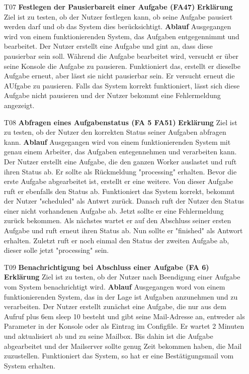 \documentclass[a4paper,12pt]{article}
\makeatletter
\newenvironment{mycode}
 {\def\@xobeysp{\ }\verbatim\rightskip=0pt plus 6em\relax}
 {\endverbatim}
\makeatother
\begin{document}
\begin{itemize}
\item[T07] \textbf{Festlegen der Pausierbareit einer Aufgabe (FA47)}
\subitem \textbf{Erklärung} Ziel ist zu testen, ob der Nutzer festlegen kann, ob seine Aufgabe pausiert werden darf und ob das System dies berücksichtigt.
\subitem \textbf{Ablauf} Ausgegangen wird von einem funktionierenden System, das Aufgaben entgegennimmt und bearbeitet.
Der Nutzer erstellt eine Aufgabe und gint an, dass diese pausierbar sein soll. Während die Aufgabe bearbeitet wird, versucht er über seine Konsole die Aufgabe zu pausieren.
Funktioniert das, erstellt er dieselbe Aufgabe erneut, aber lässt sie nicht pausierbar sein. Er versucht erneut die AUfgabe zu pausieren.
Falls das System korrekt funktioniert, lässt sich diese Aufgabe nicht pausieren und der Nutzer bekommt eine Fehlermeldung angezeigt.

\item[T08] \textbf{Abfragen eines Aufgabenstatus (FA 5 FA51)}
\subitem \textbf{Erklärung} Ziel ist zu testen, ob der Nutzer den korrekten Status seiner Aufgaben abfragen kann.
\subitem \textbf{Ablauf} Ausgegangen wird von einem funktionierenden System mit genau einem Arbeiter, das Aufgaben entegennehmen und verarbeiten kann.
Der Nutzer erstellt eine Aufgabe, die den ganzen Worker auslastet und ruft ihren Status ab. Er sollte als Rückmeldung "processing" erhalten. Bevor die erste Aufgabe abgearbeitet ist, erstellt er eine weitere.
Von dieser Aufgabe ruft er ebenfalls den Status ab. Funktioniert das System korrekt, bekommt der Nutzer "scheduled" als Antwrt zurück.
Danach ruft der Nutzer den Status einer nicht vorhandenen Aufgabe ab. Jetzt sollte er eine Fehlermeldung zurück bekommen.
Als nächstes wartet er auf den Abschluss seiner ersten Aufgabe und ruft erneut ihren Status ab. Nun sollte er "finished" als Antwort erhalten.
Zuletzt ruft er noch einmal den Status der zweiten Aufgabe ab, dieser solle jetzt "processing" sein.

\item[T09] \textbf{Benachrichtigung bei Abschluss einer Aufgabe (FA 6)}
\subitem \textbf{Erklärung} Ziel ist zu testen, ob der Nutzer nach Beendigung einer Aufgabe vom System benachrichtigt wird.
\subitem \textbf{Ablauf} Ausgegangen word von einem funktionierenden System, das in der Lage ist Aufgaben anzunehmen und zu verarbeiten.
Der Nutzer erstellt zunächst eine Aufgabe, die nur aus dem Aufruf
\begin{mycode}
sleep 10
\end{mycode}
besteht und gibt seine Mail-Adresse an, entweder als Parameter in der Konsole oder als Eintrag im \gls{Configfile}.
Er wartet 2 Minuten und aktualisiert ab und zu seine Mailbox. Bis dahin ist die Aufgabe abgearbeitet und der Mailserver sollte genug Zeit bekommen haben, die Mail zuzustellen.
Funktioniert das System, so hat er eine Bestätigungsmail vom System erhalten.


\end{itemize}
\end{document}
